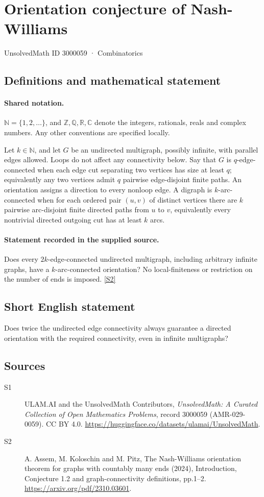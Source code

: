 \documentclass[11pt]{article}
\newcommand{\sref}[2]{\hyperlink{source:#1:#2}{[S#2]}}
\begin{document}
\setcounter{section}{3000058}
\section{Orientation conjecture of Nash-Williams}\label{3000059}
{\small\sffamily UnsolvedMath ID 3000059 · Combinatorics}
\subsection{Definitions and mathematical statement}

\paragraph{Shared notation.}$\mathbb N=\{1,2,\ldots\}$, and $\mathbb Z,\mathbb Q,\mathbb R,\mathbb C$ denote the integers, rationals, reals and complex numbers. Any other conventions are specified locally.


Let $k\in\mathbb N$, and let $G$ be an undirected multigraph, possibly infinite, with parallel edges allowed. Loops do not affect any connectivity below. Say that $G$ is $q$-edge-connected when each edge cut separating two vertices has size at least $q$; equivalently any two vertices admit $q$ pairwise edge-disjoint finite paths. An orientation assigns a direction to every nonloop edge. A digraph is $k$-arc-connected when for each ordered pair $(u,v)$ of distinct vertices there are $k$ pairwise arc-disjoint finite directed paths from $u$ to $v$, equivalently every nontrivial directed outgoing cut has at least $k$ arcs.
\paragraph{Statement recorded in the supplied source.}
Does every $2k$-edge-connected undirected multigraph, including arbitrary infinite graphs, have a $k$-arc-connected orientation? No local-finiteness or restriction on the number of ends is imposed. \sref{3000059}{2}
\subsection{Short English statement}
Does twice the undirected edge connectivity always guarantee a directed orientation with the required connectivity, even in infinite multigraphs?
\subsection{Sources}
\begin{description}
\item[\hypertarget{source:3000059:1}{S1}] ULAM.AI and the UnsolvedMath Contributors, \emph{UnsolvedMath: A Curated Collection of Open Mathematics Problems}, record 3000059 (AMR-029-0059). CC BY 4.0. \url{https://huggingface.co/datasets/ulamai/UnsolvedMath}.
\item[\hypertarget{source:3000059:2}{S2}] A. Assem, M. Koloschin and M. Pitz, The Nash-Williams orientation theorem for graphs with countably many ends (2024), Introduction, Conjecture 1.2 and graph-connectivity definitions, pp.1--2. \url{https://arxiv.org/pdf/2310.03601}.
\end{description}
\label{end:3000059}
\end{document}
